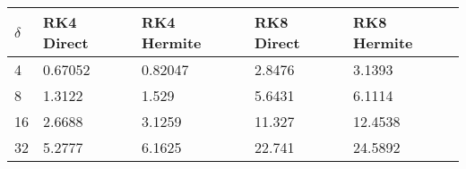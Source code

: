 \begin{tabular}{lllll}
\hline
$\delta$ & RK4 Direct & RK4 Hermite & RK8 Direct & RK8 Hermite \\ 
\hline 
4 & 0.67052 & 0.82047 & 2.8476 & 3.1393 \\ 
8 & 1.3122 & 1.529 & 5.6431 & 6.1114 \\ 
16 & 2.6688 & 3.1259 & 11.327 & 12.4538 \\ 
32 & 5.2777 & 6.1625 & 22.741 & 24.5892 \\ 
\hline 
\end{tabular}
